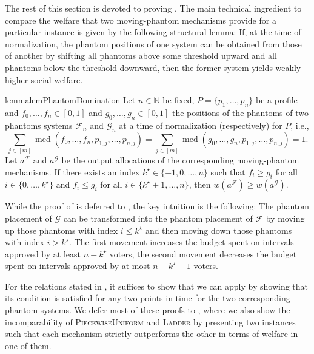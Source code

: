 \documentclass[11pt]{article}
\DeclareMathOperator*{\med}{med}
\newcommand{\F}{\mathcal{F}}
\newcommand{\G}{\mathcal{G}}
\newcommand{\N}{\mathbb{N}}
\newcommand{\p}{p}   %
\newcommand{\Ladder}{\textsc{Ladder} }
\newcommand{\PiecewiseUniform}{\textsc{PiecewiseUniform} }
\begin{document}
The rest of this section is devoted to proving . The main technical ingredient to compare the welfare that two moving-phantom mechanisms provide for a particular instance is given by the following structural lemma: 
If, at the time of normalization, the phantom positions of one system can be obtained from those of another by shifting all phantoms above some threshold upward and all phantoms below the threshold downward, then the former system yields weakly higher social welfare.



\begin{restatable}{lemma}{lemPhantomDomination} \label{lem:phantom_domination}
    Let $n \in \N$ be fixed, $P = \{p_1, \dots, p_n\}$ be a profile and $f_0, \dots, f_n \in [0,1]$ and $g_0, \dots, g_n \in [0,1]$ the positions of the phantoms of two phantoms systems $\F_n$ and $\G_n$ at a time of normalization (respectively) for $P$, i.e., $$\sum_{j \in [m]} \med(f_0, \dots, f_n, \p_{1,j}, \dots, \p_{n,j}) = \sum_{j \in [m]} \med(g_0, \dots, g_n, \p_{1,j}, \dots, \p_{n,j}) = 1.$$
    Let $a^{\F}$ and $a^{\G}$ be the output allocations of the corresponding moving-phantom mechanisms.
    If there exists an index $k^\star \in \{-1,0,\ldots,n\}$ such that $f_i \ge g_i$ for all $i \in \{0, \dots, k^\star\}$ and $f_i \le g_i$ for all $i \in \{k^\star+1, \dots, n\}$, then $w(a^{\F}) \ge w(a^{\G})$.
\end{restatable}


While the proof of  is deferred to , the key intuition is the following: The phantom placement of $\mathcal{G}$ can be transformed into the phantom placement of $\mathcal{F}$ by moving up those phantoms with index $i \leq k^\star$ and then moving down those phantoms with index $i>k^\star$. The first movement increases the budget spent on intervals approved by at least $n-k^\star$ voters, the second movement decreases the budget spent on intervals approved by at most $n-k^\star-1$ voters.

\smallskip














For the relations stated in , it suffices to show that we can apply  by showing that its condition is satisfied for any two points in time for the two corresponding phantom systems. We defer most of these proofs to , where we also show the incomparability of \PiecewiseUniform and \Ladder by presenting two instances such that each mechanism strictly outperforms the other in terms of welfare in one of them.
\end{document}

